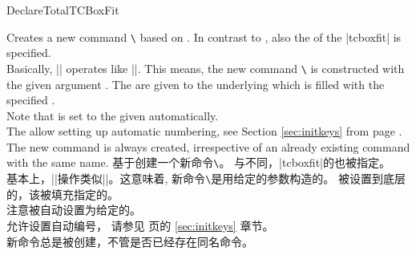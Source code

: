 \begin{docCommand}{DeclareTotalTCBoxFit}{}
\begin{stripedbox}
Creates a new command \texttt{\textbackslash} based on .
In contrast to , also the  of the |tcboxfit| is specified.\\
Basically, |\DeclareTotalTCBoxFit| operates like |\DeclareDocumentCommand|. This means,
the new command \texttt{\textbackslash} is constructed with the given argument .
The  are given to the underlying  which is filled with
the specified .\\
Note that  is set to the given 
automatically.\\
The  allow setting up automatic numbering,
see Section \ref{sec:initkeys} from page \pageref{sec:initkeys}.\\
The new command is always created, irrespective of an already existing
command with the same name.
\tcblower
基于创建一个新命令\texttt{\textbackslash}。
与不同，|tcboxfit|的也被指定。\\
基本上，|\DeclareTotalTCBoxFit|操作类似|\DeclareDocumentCommand|。这意味着,
新命令\texttt{\textbackslash}是用给定的参数构造的。
被设置到底层的，该被填充指定的。\\
注意被自动设置为给定的。\\
允许设置自动编号，
请参见 \pageref{sec:initkeys} 页的 \ref{sec:initkeys} 章节。\\
新命令总是被创建，不管是否已经存在同名命令。
\end{stripedbox}

\end{docCommand}

